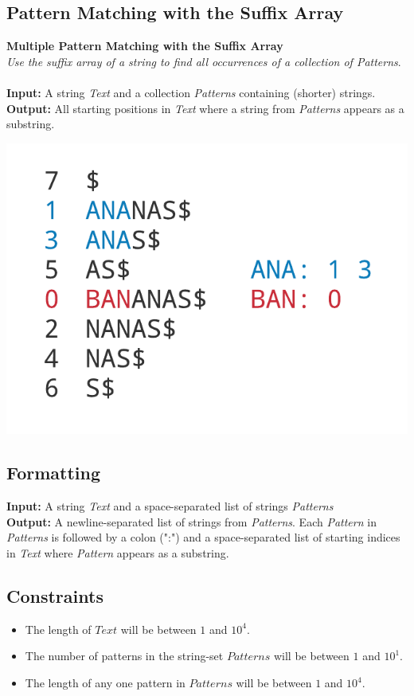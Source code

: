 \documentclass{article}
\begin{document}
\subsection{Pattern Matching with the Suffix Array}
\hline\vspace{5}
\textbf{Multiple Pattern Matching with the Suffix Array}\\
\emph{Use the suffix array of a string to find all occurrences of a collection of Patterns}.\\ \\
\textbf{Input:} A string \emph{Text} and a collection \emph{Patterns} containing (shorter) strings. \\
\textbf{Output:} All starting positions in \emph{Text} where a string from \emph{Patterns} appears as a substring.
\begin{center}
    \includegraphics[scale=0.2]{c9/logos/9H.png} 
\end{center}
\hline\vspace{5}

\subsection*{Formatting}
\textbf{Input:} A string \emph{Text} and a space-separated list of strings \emph{Patterns}\\
\noindent\textbf{Output:} A newline-separated list of strings from \emph{Patterns}. Each \emph{Pattern} in \emph{Patterns} is followed by a colon (":") and a space-separated list of starting indices in \emph{Text} where \emph{Pattern} appears as a substring.

\subsection*{Constraints}
\begin{itemize}
    \item The length of $Text$ will be between $1$ and $10^4$.
    \item The number of patterns in the string-set $Patterns$ will be between $1$ and $10^1$.
    \item The length of any one pattern in $Patterns$ will be between $1$ and $10^4$.
\end{itemize}
\end{document}
